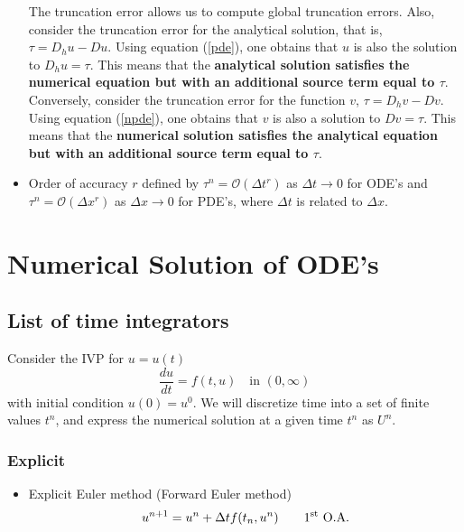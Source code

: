 \documentclass[oneside,a4paper,11pt]{report}
\begin{document}
\begin{itemize}
The truncation error allows us to compute global truncation errors. Also, consider the truncation error for the analytical solution, that is, $\tau = D_hu - Du$. Using equation (\ref{pde}), one obtains that $u$ is also the solution to $D_hu = \tau$. This means that the \textbf{analytical solution satisfies the numerical equation but with an additional source term equal to $\tau$}. Conversely, consider the truncation error for the function $v$, $\tau = D_hv - Dv$. Using equation (\ref{npde}), one obtains that $v$ is also a solution to $Dv = \tau$. This means that the \textbf{numerical solution satisfies the analytical equation but with an additional source term equal to $\tau$}.

\item Order of accuracy $r$ defined by $\tau^n = \mathcal{O}(\Delta t^r)$ as $\Delta t \to 0$ for ODE's and $\tau^n = \mathcal{O}(\Delta x^r)$ as $\Delta x \to 0$ for PDE's, where $\Delta t$ is related to $\Delta x$.

\end{itemize}

\part{Numerical Solution of ODE's}

\chapter{List of time integrators}
Consider the IVP for $u=u(t)$
\begin{equation}
\label{ode}
\frac{du}{dt} = f(t, u) \quad \text{in } (0,\infty)
\end{equation}
with initial condition $u(0) = u^0$. We will discretize time into a set of finite values $t^n$, and express the numerical solution at a given time $t^n$ as $U^n$. 

\section{Explicit}
\begin{itemize}
\item Explicit Euler method (Forward Euler method)
\begin{equation}
u^{n+1} = u^n + \Delta t f(t_n, u^n) \qquad \text{1\textsuperscript{st} O.A.}
\end{equation}
\end{itemize}
\end{document}
